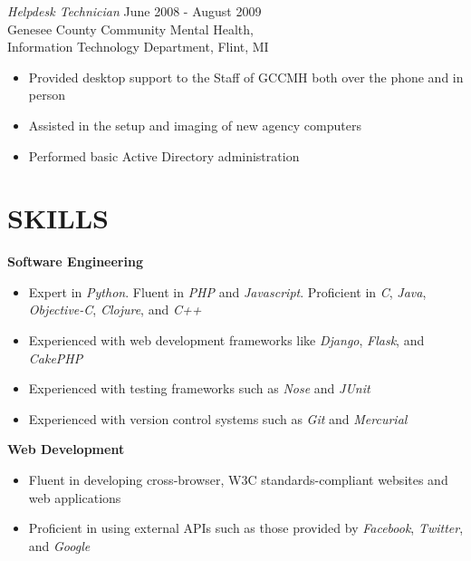 \documentclass[line,margin]{res}
\begin{document}
\begin{resume}
    {\sl Helpdesk Technician}
            \hfill June 2008 - August 2009 \\
                   Genesee County Community Mental Health, \\
                   Information Technology Department, Flint, MI
        \begin{itemize}
            \item Provided desktop support to the Staff of GCCMH both
                  over the phone and in person
            \item Assisted in the setup and imaging of new agency
                  computers
            \item Performed basic Active Directory administration
        \end{itemize}


\section{SKILLS}
    \textbf{Software Engineering}
    \begin{itemize}
        \item Expert in {\sl Python}.
              Fluent in {\sl PHP} and {\sl Javascript}.
              Proficient in {\sl C}, {\sl Java}, {\sl Objective-C},
                {\sl Clojure}, and {\sl C++}
        \item Experienced with web development frameworks like {\sl Django},
              {\sl Flask}, and {\sl CakePHP}
        \item Experienced with testing frameworks such as {\sl Nose} and {\sl JUnit}
        \item Experienced with version control systems such as {\sl Git} and {\sl Mercurial}
    \end{itemize}

    \textbf{Web Development}
    \begin{itemize}
        \item Fluent in developing cross-browser, W3C standards-compliant websites
              and web applications
        \item Proficient in using external APIs such as those provided by {\sl Facebook},
              {\sl Twitter}, and {\sl Google}
    \end{itemize}


\end{resume}
\end{document}
